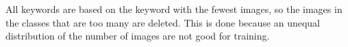 \documentclass[../ImageClassifier.tex]{subfiles}
\begin{document}
    All keywords are based on the keyword with the fewest images, so the images in the classes that are too many are deleted.
    This is done because an unequal distribution of the number of images are not good for training.
\end{document}
